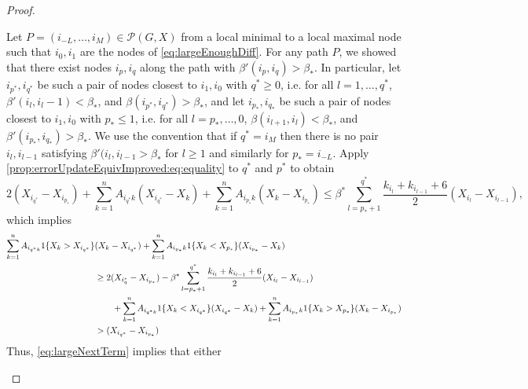 \documentclass{article}
\theoremstyle{remark}
\begin{document}
\begin{proof}
\begin{enumerate}
			Let $P=(i_{-L},\ldots,i_M)\in\mathcal{P}(G,X)$ from a local minimal to a local maximal node such that $i_0,i_1$ are the nodes of \eqref{eq:largeEnoughDiff}. For any path $P$, we showed that there exist nodes $i_p,i_q$ along the path with $\beta'(i_p,i_q)>\beta_*$. In particular, let $i_{p^*},i_{q^*}$ be such a pair of nodes closest to $i_1,i_0$ with $q^*\geq0$, i.e. for all $l=1,\ldots,q^*$, $\beta'(i_l,i_l-1)<\beta_*$, and $\beta(i_{p^*},i_{q^*})>\beta_*$, and let $i_{p_*},i_{q_*}$ be such a pair of nodes closest to $i_1,i_0$ with $p_*\leq 1$, i.e. for all $l=p_*,\ldots,0$, $\beta(i_{l+1},i_{l})<\beta_*$, and $\beta'(i_{p_*},i_{q_*})>\beta_*$. We use the convention that if $q^*=i_M$ then there is no pair $i_l,i_{l-1}$ satisfying $\beta'(i_l,i_{l-1}>\beta_*$ for $l\geq1$ and similarly for $p_*=i_{-L}$. Apply \eqref{prop:errorUpdateEquivImproved:eq:equality} to $q^*$ and $p^*$ to obtain
			\begin{equation}
			2(X_{i_{q^*}}-X_{i_{p_*}}) + \sum_{k=1}^nA_{i_{q^*}k}(X_{i_{q^*}}-X_k) + \sum_{k=1}^nA_{i_{p_*}k}(X_k-X_{i_{p_*}}) \leq \beta^*\sum_{l=p_*+1}^{q^*}\frac{k_{i_{l}}+k_{i_{l-1}}+6}{2}(X_{i_l}-X_{i_{l-1}}),
			\end{equation}
			which implies
			\begin{equation}{\label{eq:largeNextTerm}}
			\begin{aligned}
				\sum_{k=1}^nA_{i_{q^*k}}1\{X_{k}>X_{i_{q^*}}\}&(X_{k}-X_{i_{q^*}}) + \sum_{k=1}^nA_{i_{p_*}k}1\{X_{k}<X_{p_*}\}(X_{i_{p_*}}-X_{k})\\ &\geq 2(X_{i_q^*}-X_{i_{p_*}}) - \beta^*\sum_{l=p_*+1}^{q^*}\frac{k_{i_{l}}+k_{i_{l-1}}+6}{2}(X_{i_l}-X_{i_{l-1}}) \\&\qquad+ \sum_{k=1}^nA_{i_{q^*k}}1\{X_{k}<X_{i_{q^*}}\}(X_{i_{q^*}}-X_{k}) + \sum_{k=1}^nA_{i_{p_*}k}1\{X_{k}>X_{p_*}\}(X_{k}-X_{i_{p_*}})\\
				&>(X_{i_{q^*}}-X_{i_{p_*}})
			\end{aligned}
		\end{equation}
			Thus, \eqref{eq:largeNextTerm} implies that either 
			

\end{enumerate}
\end{proof}
\end{document}
